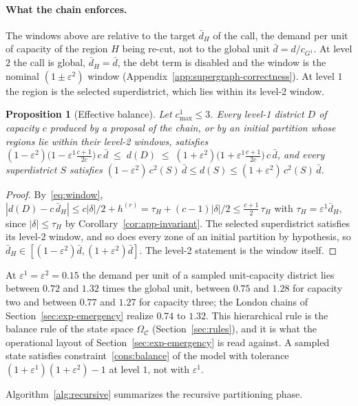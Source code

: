 \documentclass[11pt]{article}
\newtheorem{proposition}[theorem]{Proposition}
\theoremstyle{definition}
\begin{document}
\paragraph{What the chain enforces.}
The windows above are relative to the target $\bar d_H$ of the call, the demand per unit of capacity of the region $H$ being re-cut, not to the global unit $\bar d = d/c_{G^1}$. At level $2$ the call is global, $\bar d_H = \bar d$, the debt term is disabled and the window is the nominal $(1\pm\varepsilon^2)$ window (Appendix~\ref{app:supergraph-correctness}). At level $1$ the region is the selected superdistrict, which lies within its level-2 window.
\begin{proposition}[Effective balance]\label{prop:effective}
Let $c^1_{\max}\le 3$. Every level-1 district $D$ of capacity $c$ produced by a proposal of the chain, or by an initial partition whose regions lie within their level-2 windows, satisfies
$(1-\varepsilon^2)\bigl(1-\varepsilon^1\tfrac{c+1}{2c}\bigr)\,c\,\bar d \;\le\; d(D) \;\le\; (1+\varepsilon^2)\bigl(1+\varepsilon^1\tfrac{c+1}{2c}\bigr)\,c\,\bar d$,
and every superdistrict $S$ satisfies $(1-\varepsilon^2)\,c^2(S)\,\bar d \le d(S) \le (1+\varepsilon^2)\,c^2(S)\,\bar d$.
\end{proposition}
\begin{proof}
By~\eqref{eq:window}, $|d(D)-c\,\bar d_H| \le c|\delta|/2 + h^{(r)} = \tau_H + (c-1)|\delta|/2 \le \tfrac{c+1}{2}\,\tau_H$ with $\tau_H = \varepsilon^1 \bar d_H$, since $|\delta|\le\tau_H$ by Corollary~\ref{cor:app-invariant}. The selected superdistrict satisfies its level-2 window, and so does every zone of an initial partition by hypothesis, so $\bar d_H \in [(1-\varepsilon^2)\bar d,(1+\varepsilon^2)\bar d]$. The level-2 statement is the window itself.
\end{proof}
At $\varepsilon^1 = \varepsilon^2 = 0.15$ the demand per unit of a sampled unit-capacity district lies between $0.72$ and $1.32$ times the global unit, between $0.75$ and $1.28$ for capacity two and between $0.77$ and $1.27$ for capacity three; the London chains of Section~\ref{sec:exp-emergency} realize $0.74$ to $1.32$. This hierarchical rule is the balance rule of the state space $\Omega_{\mathcal C}$ (Section~\ref{sec:rules}), and it is what the operational layout of Section~\ref{sec:exp-emergency} is read against. A sampled state satisfies constraint~\eqref{cons:balance} of the model with tolerance $(1+\varepsilon^1)(1+\varepsilon^2)-1$ at level $1$, not with $\varepsilon^1$.

Algorithm~\ref{alg:recursive} summarizes the recursive partitioning phase.
\end{document}
